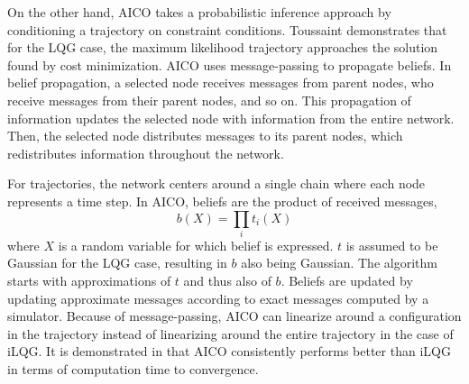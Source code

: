 \documentclass[12pt]{article}
\begin{document}
            \begin{figure}
                \centering
            \end{figure}

            \par On the other hand, AICO takes a probabilistic inference approach by conditioning a trajectory on constraint conditions. Toussaint demonstrates that for the LQG case, the maximum likelihood trajectory approaches the solution found by cost minimization. AICO uses message-passing to propagate beliefs. In belief propagation, a selected node receives messages from parent nodes, who receive messages from their parent nodes, and so on. This propagation of information updates the selected node with information from the entire network. Then, the selected node distributes messages to its parent nodes, which redistributes information throughout the network. \cite{minka_expectation_nodate}
            \par For trajectories, the network centers around a single chain where each node represents a time step. In AICO, beliefs are the product of received messages,
            \begin{equation}
                b(X)=\prod_{i}t_{i}(X)
            \end{equation}
            where $X$ is a random variable for which belief is expressed. $t$ is assumed to be Gaussian for the LQG case, resulting in $b$ also being Gaussian. The algorithm starts with approximations of $t$ and thus also of $b$. Beliefs are updated by updating approximate messages according to exact messages computed by a simulator.
            Because of message-passing, AICO can linearize around a configuration in the trajectory instead of linearizing around the entire trajectory in the case of iLQG.\cite{toussaint_robot_2009} It is demonstrated in \cite{toussaint_robot_2009} that AICO consistently performs better than iLQG in terms of computation time to convergence.
\end{document}
